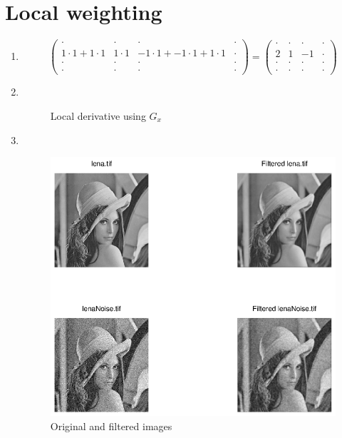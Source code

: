 \documentclass[DIN, pagenumber=false, fontsize=11pt, parskip=half]{scrartcl}
\begin{document}
    \section{Local weighting}
    \begin{enumerate}
        \item 
            \begin{equation*}
                \begin{pmatrix}
                    \cdot & \cdot & \cdot & \cdot \\
                    1 \cdot 1 + 1 \cdot 1 & 1 \cdot 1 & -1 \cdot 1 + -1 \cdot 1 + 1 \cdot 1  & \cdot \\
                    \cdot & \cdot & \cdot & \cdot \\
                    \cdot & \cdot & \cdot & \cdot
                \end{pmatrix} =
                \begin{pmatrix}
                    \cdot & \cdot & \cdot & \cdot \\
                    2 & 1 & -1 & \cdot \\
                    \cdot & \cdot & \cdot & \cdot \\
                    \cdot & \cdot & \cdot & \cdot
                \end{pmatrix}
            \end{equation*}
        \item $ $
            \begin{figure}[H]
                \centering
                
                \caption{Local derivative using $G_x$}
            \end{figure} 
        \item $ $ 
            \begin{figure}[H]
                \centering
                \includegraphics[trim = {0 9cm 27cm 0}, clip,width=\textwidth]{BoxFilter}
                \caption{Original and filtered images}
            \end{figure} 
    \end{enumerate}
\end{document}
